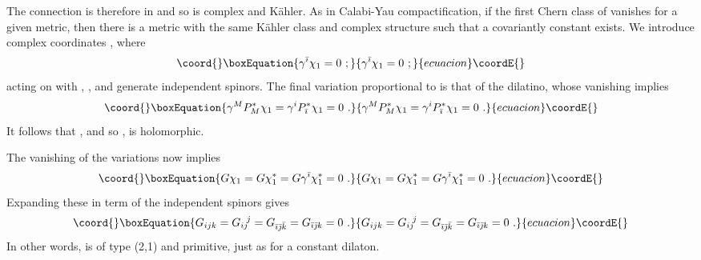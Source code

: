 \documentclass[a4paper,12pt]{article}
\renewcommand{\=}[1]{\bar{#1}}
\begin{document}
The
connection \coordHE{} is therefore in \coordHE{} and so \coordHE{}
is complex and K\"ahler.  As in Calabi-Yau compactification, if the first
Chern class of \coordHE{} vanishes for a given metric,
then there is a metric with the same K\"ahler class and complex structure
such that a covariantly constant \coordHE{} exists.
We introduce complex coordinates \coordHE{}, where
\begin{equation}\coord{}\boxEquation{
\gamma^{\bar\imath} \chi_1 = 0\ ;
}{
\gamma^{\bar\imath} \chi_1 = 0\ ;
}{ecuacion}\coordE{}\end{equation}
acting on \coordHE{} with \coordHE{}, \coordHE{}, and \coordHE{}
generate independent spinors.
The final variation proportional to \myHighlight{$\varepsilon$}\coordHE{} is that of the dilatino,
whose vanishing implies
\begin{equation}\coord{}\boxEquation{
\gamma^{M}P_{M}^*\chi_1 = \gamma^{i}P_{\bar \imath}^*\chi_1 = 0\ .
\label{dilholo}
}{
\gamma^{M}P_{M}^*\chi_1 = \gamma^{i}P_{\bar \imath}^*\chi_1 = 0\ .
}{ecuacion}\coordE{}\end{equation}
It follows that \coordHE{}, and so \myHighlight{$\tau$}\coordHE{}, is holomorphic.

The vanishing of the \myHighlight{$\varepsilon^*$}\coordHE{} variations now implies
\begin{equation}\coord{}\boxEquation{
G \chi_1 = G \chi_1^* = G \gamma^{\bar \imath} \chi_1^* = 0\ .
\label{conditions}
}{
G \chi_1 = G \chi_1^* = G \gamma^{\bar \imath} \chi_1^* = 0\ .
}{ecuacion}\coordE{}\end{equation}
Expanding these in term of the independent spinors gives
\begin{equation}\coord{}\boxEquation{
G_{ijk} = G_{ij}\!^j = G_{\bar\imath\bar\jmath\bar k} =
G_{\bar\imath\bar\jmath k} = 0\ . \label{21}
}{
G_{ijk} = G_{ij}\!^j = G_{\bar\imath\bar\jmath\bar k} =
G_{\bar\imath\bar\jmath k} = 0\ . }{ecuacion}\coordE{}\end{equation}
In other words, \coordHE{} is of type (2,1) and primitive, just as for a constant
dilaton.
\end{document}
